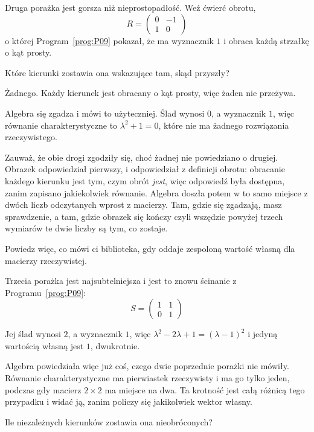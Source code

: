 \begin{fr}
Druga porażka jest gorsza niż nieprostopadłość. Weź ćwierć obrotu,
\[ R = \begin{pmatrix} 0 & -1 \\ 1 & 0 \end{pmatrix} \]
o której Program~\ref{prog:P09} pokazał, że ma wyznacznik $1$ i obraca każdą
strzałkę o kąt prosty.

Które kierunki zostawia ona wskazujące tam, skąd przyszły?
\dotline
\nextframe
\end{fr}

\begin{fr}
\begin{ansblock}
Żadnego. Każdy kierunek jest obracany o kąt prosty, więc żaden nie przeżywa.
\end{ansblock}

Algebra się zgadza i mówi to użyteczniej. Ślad wynosi $0$, a wyznacznik $1$,
więc równanie charakterystyczne to $\lambda^{2} + 1 = 0$, które nie ma żadnego
rozwiązania rzeczywistego.

Zauważ, że obie drogi zgodziły się, choć żadnej nie powiedziano o drugiej.
Obrazek odpowiedział pierwszy, i odpowiedział z definicji obrotu: obracanie
każdego kierunku jest tym, czym obrót \emph{jest}, więc odpowiedź była dostępna,
zanim zapisano jakiekolwiek równanie. Algebra doszła potem w to samo miejsce z
dwóch liczb odczytanych wprost z macierzy. Tam, gdzie się zgadzają, masz
sprawdzenie, a tam, gdzie obrazek się kończy \dash{} czyli wszędzie powyżej
trzech wymiarów \dash{} te dwie liczby są tym, co zostaje.

Powiedz więc, co mówi ci biblioteka, gdy oddaje zespoloną wartość własną dla
macierzy rzeczywistej.
\dotline
\nextframe
\end{fr}

\begin{fr}
Trzecia porażka jest najsubtelniejsza i jest to znowu ścinanie z
Programu~\ref{prog:P09}:
\[ S = \begin{pmatrix} 1 & 1 \\ 0 & 1 \end{pmatrix} \]

Jej ślad wynosi $2$, a wyznacznik $1$, więc $\lambda^{2} - 2\lambda + 1 =
(\lambda - 1)^{2}$ i jedyną wartością własną jest $1$, dwukrotnie.

Algebra powiedziała więc już coś, czego dwie poprzednie porażki nie mówiły.
Równanie charakterystyczne ma pierwiastek rzeczywisty i ma go tylko jeden,
podczas gdy macierz $2 \times 2$ ma miejsce na dwa. Ta krotność jest całą
różnicą tego przypadku i widać ją, zanim policzy się jakikolwiek wektor
własny.

Ile niezależnych kierunków zostawia ona nieobróconych?
\dotline
\nextframe
\end{fr}

